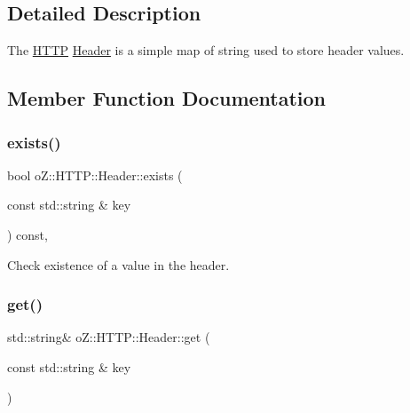 \subsection{Detailed Description}
The \mbox{\hyperlink{namespaceo_z_1_1_h_t_t_p}{H\+T\+TP}} \mbox{\hyperlink{classo_z_1_1_h_t_t_p_1_1_header}{Header}} is a simple map of string used to store header values. 

\subsection{Member Function Documentation}
\mbox{\label{classo_z_1_1_h_t_t_p_1_1_header_a6981daf90cda100da0e23a516991d35b}} 
\subsubsection{\texorpdfstring{exists()}{exists()}}
{\footnotesize\ttfamily bool o\+Z\+::\+H\+T\+T\+P\+::\+Header\+::exists (\begin{DoxyParamCaption}\item[{const std\+::string \&}]{key }\end{DoxyParamCaption}) const\hspace{0.3cm}{\ttfamily [inline]}, {\ttfamily [noexcept]}}



Check existence of a value in the header. 

\mbox{\label{classo_z_1_1_h_t_t_p_1_1_header_aeedea8bfa094294f0f5892bc9736c48e}} 
\subsubsection{\texorpdfstring{get()}{get()}\hspace{0.1cm}{\footnotesize\ttfamily [1/2]}}
{\footnotesize\ttfamily std\+::string\& o\+Z\+::\+H\+T\+T\+P\+::\+Header\+::get (\begin{DoxyParamCaption}\item[{const std\+::string \&}]{key }\end{DoxyParamCaption})\hspace{0.3cm}{\ttfamily [inline]}}



